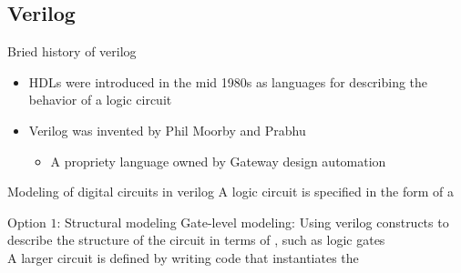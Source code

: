     \subsection{Verilog}
    \begin{parag}{Bried history of verilog}
        \begin{itemize}
            \item HDLs were introduced in the mid 1980s as languages for describing the behavior of a logic circuit
            \item Verilog was invented by Phil Moorby and Prabhu 
                \begin{itemize}
                    \item A propriety language owned by Gateway design automation
                \end{itemize}
        \end{itemize}
    
    \end{parag}
    
   \begin{parag}{Modeling of digital circuits in verilog}
       A logic circuit is specified in the form of a 
       \begin{subparag}{Option $1$: Structural modeling}
           Gate-level modeling: Using verilog constructs to describe the structure of the circuit in terms of , such as logic gates\\
           A larger circuit is defined by writing code that instantiates the 
           
       \end{subparag}
   
   \end{parag}
    

